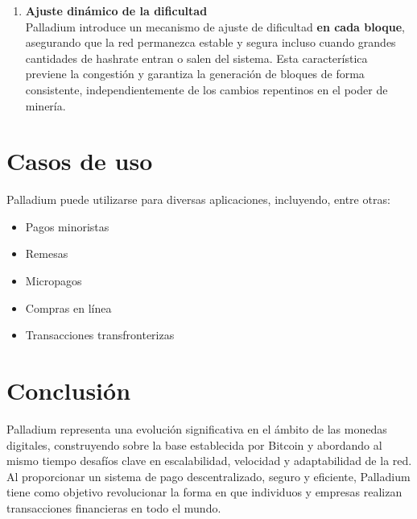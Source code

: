 \documentclass[11pt,a4paper]{article}
\begin{document}
\begin{enumerate}
    \item \textbf{Ajuste dinámico de la dificultad} \\ 
    Palladium introduce un mecanismo de ajuste de dificultad \textbf{en cada bloque}, asegurando que la red permanezca estable y segura incluso cuando grandes cantidades de hashrate entran o salen del sistema. Esta característica previene la congestión y garantiza la generación de bloques de forma consistente, independientemente de los cambios repentinos en el poder de minería.
\end{enumerate}

\section{Casos de uso}
Palladium puede utilizarse para diversas aplicaciones, incluyendo, entre otras:
\begin{itemize}
    \item Pagos minoristas
    \item Remesas
    \item Micropagos
    \item Compras en línea
    \item Transacciones transfronterizas
\end{itemize}

\section{Conclusión}
Palladium representa una evolución significativa en el ámbito de las monedas digitales, construyendo sobre la base establecida por Bitcoin y abordando al mismo tiempo desafíos clave en escalabilidad, velocidad y adaptabilidad de la red. Al proporcionar un sistema de pago descentralizado, seguro y eficiente, Palladium tiene como objetivo revolucionar la forma en que individuos y empresas realizan transacciones financieras en todo el mundo.
\end{document}
